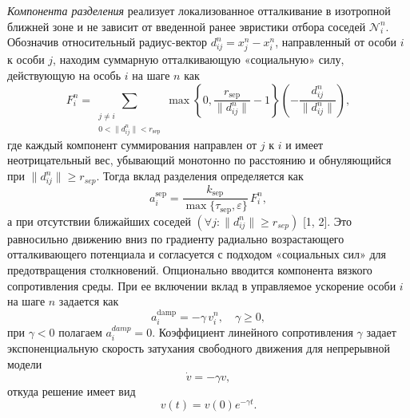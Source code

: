 \documentclass{article}
\begin{document}
\textit{Компонента разделения} реализует локализованное отталкивание в изотропной ближней зоне и не зависит от введенной ранее эвристики отбора соседей $\mathcal N_i^n$. Обозначив относительный радиус-вектор $d_{ij}^n=x_j^n-x_i^n$, направленный от особи $i$ к особи $j$, находим суммарную отталкивающую «социальную» силу, действующую на особь $i$ на шаге $n$ как
\begin{equation}
    F_i^n=\sum_{\substack{j\ne i\\[3pt] 0<\|d_{ij}^n\| < r_{\mathrm{sep}}}}
    \max\!\left\{0,\frac{r_{\mathrm{sep}}}{\|d_{ij}^n\|}-1\right\}\!\left(-\frac{d_{ij}^n}{\|d_{ij}^n\|}\right),
\end{equation}
где каждый компонент суммирования направлен от $j$ к $i$ и имеет неотрицательный вес, убывающий монотонно по расстоянию и обнуляющийся при $\|d_{ij}^n \| \ge r_{sep}$. Тогда вклад разделения определяется как
\begin{equation}
    a_i^{\mathrm{sep}}=\frac{k_{\mathrm{sep}}}{\max\{\tau_{\mathrm{sep}},\varepsilon\}}\,F_i^n,
\end{equation}
а при отсутствии ближайших соседей $\left( \forall j : \| d_{ij}^n \| \ge r_{sep} \right)$ [1, 2]. Это равносильно движению вниз по градиенту радиально возрастающего отталкивающего потенциала и согласуется с подходом «социальных сил» для предотвращения столкновений. Опционально вводится компонента вязкого сопротивления среды. При ее включении вклад в управляемое ускорение особи $i$ на шаге $n$ задается как
\begin{equation}
    a_i^{\mathrm{damp}}=-\gamma\,v_i^n,\quad \gamma \ge 0,
\end{equation}
при $\gamma < 0$ полагаем $a_i^{damp} = 0$. Коэффициент линейного сопротивления $\gamma$ задает экспоненциальную скорость затухания свободного движения для непрерывной модели
\begin{equation}
    \dot{v} =- \gamma v,
\end{equation}
откуда решение имеет вид 
\begin{equation}
    v(t) = v(0) e^{-\gamma t}.
\end{equation}
\end{document}
